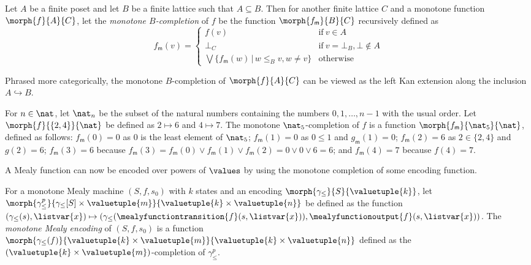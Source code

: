 \documentclass{lmcs}
\begin{document}
\begin{defi}\label{def:monotone-completion}
    Let \(A\) be a finite poset and let \(B\) be a finite lattice such that
    \(A \subseteq B\).
    Then for another finite lattice \(C\) and a monotone function
    \(\morph{f}{A}{C}\), let the \emph{monotone \(B\)-completion} of \(f\) be
    the function \(\morph{f_\mathsf{m}}{B}{C}\) recursively defined as \[
        f_\mathsf{m}(v) = \begin{cases}
            f(v)
             &
            \text{if}\ v \in A
            \\
            \bot_C
             &
            \text{if}\ v = \bot_B, \bot \not\in A
            \\
            \bigvee \{ f_\mathsf{m}(w) \,|\, w \leq_B v, w \neq v \}
             &
            \text{otherwise}
        \end{cases}
    \]
\end{defi}

\begin{rem}
    Phrased more categorically, the monotone \(B\)-completion of
    \(\morph{f}{A}{C}\) can be viewed as the
    left Kan extension along the inclusion \(A \hookrightarrow B\).
\end{rem}

\begin{exa}
    For \(n \in \nat\), let \(\nat_{n}\) be the subset of the natural numbers
    containing the numbers \(0,1,\dots,n-1\) with the usual order.
    Let \(\morph{f}{\{2,4\}}{\nat}\) be defined as \(2 \mapsto 6\) and
    \(4 \mapsto 7\).
    The monotone \(\nat_5\)-completion of \(f\) is a function
    \(\morph{f_\mathsf{m}}{\nat_5}{\nat}\), defined as follows:
    \(f_\mathsf{m}(0) = 0\) as \(0\) is the least element of \(\nat_5\);
    \(f_\mathsf{m}(1) = 0\) as \(0 \leq 1\) and \(g_\mathsf{m}(1) = 0\);
    \(f_\mathsf{m}(2) = 6\) as \(2 \in \{2, 4\}\) and \(g(2) = 6\);
    \(f_\mathsf{m}(3) = 6\) because \(
    f_\mathsf{m}(3) =
    f_\mathsf{m}(0) \vee f_\mathsf{m}(1) \vee f_\mathsf{m}(2)
    = 0 \vee 0 \vee 6 = 6
    \); and \(f_\mathsf{m}(4) = 7\) because \(f(4) = 7\).
\end{exa}


A Mealy function can now be encoded over powers of \(\values\) by using the
monotone completion of some encoding function.

\begin{defi}\label{def:mealy-encoding}
    For a monotone Mealy machine \((S, f, s_0)\) with \(k\) states and an
    encoding \(\morph{\gamma_\leq}{S}{\valuetuple{k}}\), let
    \(\morph{\gamma^p_\leq}{\gamma_\leq[S] \times \valuetuple{m}}{\valuetuple{k} \times \valuetuple{n}}\)
    be defined as the function \(
    (\gamma_\leq(s), \listvar{x}) \mapsto
    (\gamma_\leq(\mealyfunctiontransition{f}(s, \listvar{x})),
    \mealyfunctionoutput{f}(s, \listvar{x}))
    \).
    The \emph{monotone Mealy encoding} of \((S, f, s_0)\) is a function
    \(
    \morph{
        \gamma_\leq(f)
    }{
        \valuetuple{k} \times \valuetuple{m}
    }{
        \valuetuple{k} \times \valuetuple{n}
    }
    \) defined as the \((\valuetuple{k} \times \valuetuple{m})\)-completion of
    \(\gamma_\leq^p\).
\end{defi}
\end{document}
